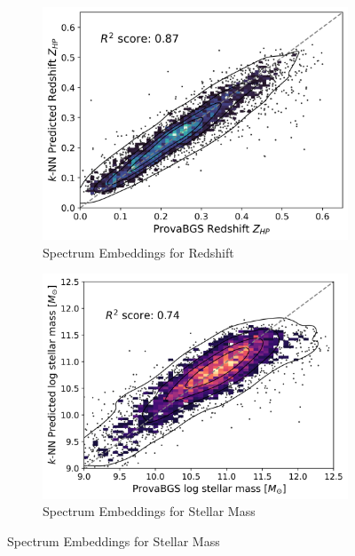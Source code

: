 \documentclass[draft, a4paper,12pt]{article}
\begin{document}
\begin{figure}[H]
    \begin{subfigure}[b]{0.48\textwidth}
        \centering
        \includegraphics[width=\textwidth]{../figures/zeroshot_redshift_spectrum.png}
        \caption{Spectrum Embeddings for Redshift}
        \label{fig:redshift_spectrum}
    \end{subfigure}%
    \hfill
    \begin{subfigure}[b]{0.48\textwidth}
        \centering
        \includegraphics[width=\textwidth]{../figures/zeroshot_stellarmass_spectrum.png}
        \caption{Spectrum Embeddings for Stellar Mass}
        \label{fig:stellarmass_spectrum}
    \end{subfigure}


\end{figure}
\end{document}
